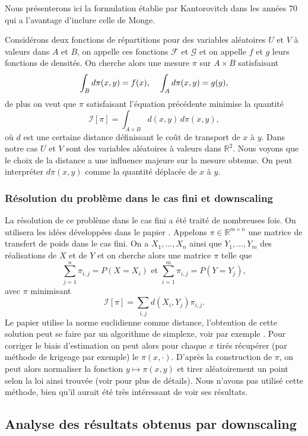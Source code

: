 \documentclass[a4paper,11pt]{article}
\numberwithin{equation}{section}
\begin{document}
Nous présenterons ici la formulation établie par Kantorovitch dans les années $70$ qui a l'avantage d'inclure celle de Monge.

Considérons deux fonctions de répartitions pour des variables aléatoires $U$ et $V$ à valeurs dans $A$ et $B$, on appelle ces fonctions $\mathcal{F}$ et $\mathcal{G}$ et on appelle $f$ et $g$ leurs fonctions de densités. On cherche alors une mesure $\pi$ sur  $A \times B$ satisfaisant
\[\int_{B} d\pi(x,y)= f(x), \hspace{4mm} \int_{A}  d \pi(x,y)= g(y),\]
de plus on veut que $\pi$ satisfaisant l'équation précédente minimise la quantité
\[\mathcal{I}[\pi]=\int_{A \times B}d(x,y) \, d\pi(x,y),\]
où $d$ est une certaine distance définissant le coût de transport de $x$ à $y$. Dans notre cas $U$ et $V$ sont des variables aléatoires à valeurs dans $\mathbb{R}^2$. Nous voyons que le choix de la distance a une influence majeure sur la mesure obtenue. On peut interpréter $d\pi(x,y)$ comme la quantité déplacée de $x$ à $y$.
\subsubsection{Résolution du problème dans le cas fini et downscaling}
La résolution de ce problème dans le cas fini a été traité de nombreuses fois. On utilisera les idées développées dans le papier \cite{robin2019multivariate}. Appelons $\pi \in \mathbb{R}^{m\times n}$ une matrice de transfert de poids dans le cas fini. On a $X_1,...,X_n$ ainsi que $Y_1,...,Y_m$ des réalisations de $X$ et de $Y$ et on cherche alors une matrice $\pi$ telle que 
\[\sum_{j=1}^{n} \pi_{i,j}= P(X=X_i) \textrm{ et } \sum_{i=1}^{m} \pi_{i,j}= P(Y=Y_j),\]
avec $\pi$ minimisant 
\[\mathcal{I}[\pi]=\sum_{i,j}d(X_i,Y_j)\pi_{i,j}.\]  
Le papier \cite{robin2019multivariate} utilise la norme euclidienne comme distance, l'obtention de cette solution peut se faire par un algorithme de simplexe, voir par exemple \cite{huang2012optimal}. Pour corriger le biais d'estimation on peut alors pour chaque $x$ tirés récupérer (par méthode de krigeage par exemple) le $\pi(x,\cdot)$. D'après la construction de $\pi$, on peut alors normaliser la fonction $y\mapsto \pi(x,y)$ et tirer aléatoirement un point selon la loi ainsi trouvée (voir \cite{robin2019multivariate} pour plus de détails). Nous n'avons pas utilisé cette méthode, bien qu'il aurait été très intéressant de voir ses résultats.


\subsection{Analyse des résultats obtenus par downscaling}
\label{analyse-pred}
\end{document}
